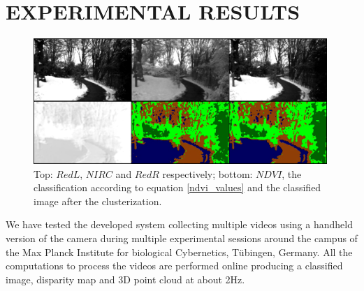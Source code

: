 \documentclass[a4paper, 10pt, conference]{ieeeconf}      %
\begin{document}
\section{EXPERIMENTAL RESULTS}\label{sec:experimental_setup}


\begin{figure}[t!]
      \centering
      \includegraphics[width=0.99\textwidth]{../images/frame_1.jpg}
      \caption{Top: $RedL$, $NIRC$ and $RedR$ respectively; bottom: $NDVI$, the classification according to equation \eqref{ndvi_values} and the classified image after the clusterization.}
       \label{fig:frame1}
\end{figure}




We have tested the developed system collecting multiple videos using a handheld version of the camera during multiple experimental sessions around the campus of the Max Planck Institute for biological Cybernetics, T{\"u}bingen, Germany.
All the computations to process the videos are performed online producing a classified image, disparity map and 3D point cloud at about 2Hz.





\end{document}
